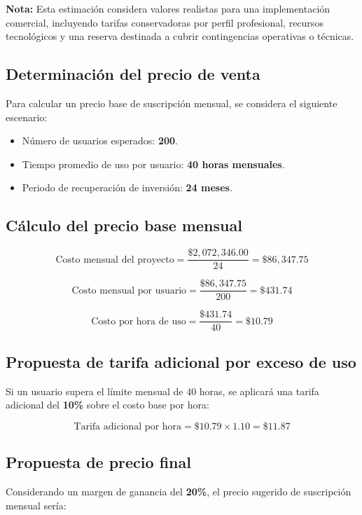 \noindent \textbf{Nota:} Esta estimación considera valores realistas para una implementación comercial, incluyendo tarifas conservadoras por perfil profesional, recursos tecnológicos y una reserva destinada a cubrir contingencias operativas o técnicas.

\subsection{Determinación del precio de venta}

Para calcular un precio base de suscripción mensual, se considera el siguiente escenario:

\begin{itemize}
	\item Número de usuarios esperados: \textbf{200}.
	\item Tiempo promedio de uso por usuario: \textbf{40 horas mensuales}.
	\item Periodo de recuperación de inversión: \textbf{24 meses}.
\end{itemize}

\subsection{Cálculo del precio base mensual}

\[
\text{Costo mensual del proyecto} = \frac{\$2,072,346.00}{24} = \$86,347.75
\]

\[
\text{Costo mensual por usuario} = \frac{\$86,347.75}{200} = \$431.74
\]

\[
\text{Costo por hora de uso} = \frac{\$431.74}{40} = \$10.79
\]

\subsection{Propuesta de tarifa adicional por exceso de uso}

Si un usuario supera el límite mensual de 40 horas, se aplicará una tarifa adicional del \textbf{10\%} sobre el costo base por hora:

\[
\text{Tarifa adicional por hora} = \$10.79 \times 1.10 = \$11.87
\]

\subsection{Propuesta de precio final}

Considerando un margen de ganancia del \textbf{20\%}, el precio sugerido de suscripción mensual sería:

